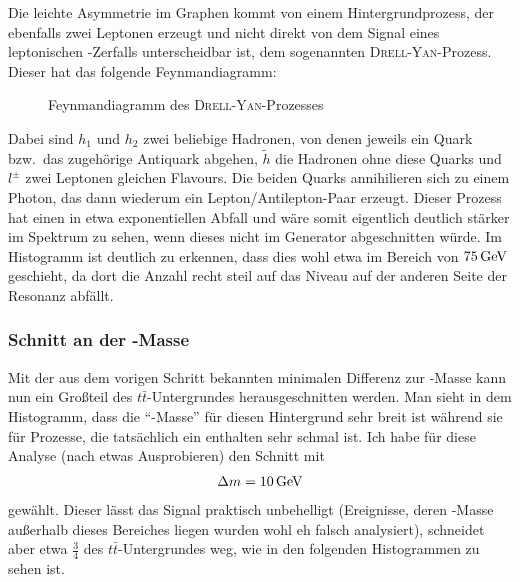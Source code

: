 Die leichte Asymmetrie im Graphen kommt von einem Hintergrundprozess, der
ebenfalls zwei Leptonen erzeugt und nicht direkt von dem Signal eines
leptonischen \Z-Zerfalls unterscheidbar ist, dem sogenannten
\textsc{Drell}-\textsc{Yan}-Prozess. Dieser hat das folgende Feynmandiagramm:
\begin{figure}[h!]
  \begin{center}
    
  \end{center}
  \caption{Feynmandiagramm des \textsc{Drell}-\textsc{Yan}-Prozesses}
  \label{fig:drellyan}
\end{figure}
Dabei sind $h_1$ und $h_2$ zwei beliebige Hadronen, von denen jeweils ein Quark
bzw.\ das zugehörige Antiquark abgehen, $\tilde{h}$ die Hadronen ohne diese
Quarks und $l^\pm$ zwei Leptonen gleichen Flavours. Die beiden Quarks
annihilieren sich zu einem Photon, das dann wiederum ein Lepton/Antilepton-Paar
erzeugt. Dieser Prozess hat einen in etwa exponentiellen Abfall und wäre somit
eigentlich deutlich stärker im Spektrum zu sehen, wenn dieses nicht im Generator
abgeschnitten würde. Im Histogramm ist deutlich zu erkennen, dass dies wohl etwa
im Bereich von $\unit[75]{GeV}$ geschieht, da dort die Anzahl recht steil auf
das Niveau auf der anderen Seite der Resonanz abfällt.

\subsubsection{Schnitt an der \Z-Masse}
Mit der aus dem vorigen Schritt bekannten minimalen Differenz zur \Z-Masse kann
nun ein Großteil des $t\bar{t}$-Untergrundes herausgeschnitten werden. Man sieht
in dem Histogramm, dass die "`\Z-Masse"' für diesen Hintergrund sehr breit ist
während sie für Prozesse, die tatsächlich ein \Z enthalten sehr schmal ist. Ich
habe für diese Analyse (nach etwas Ausprobieren) den Schnitt mit
\begin{align}
  \Delta m = \unit[10]{GeV}
\end{align}
gewählt. Dieser lässt das Signal praktisch unbehelligt (Ereignisse, deren
\Z-Masse außerhalb dieses Bereiches liegen wurden wohl eh falsch analysiert),
schneidet aber etwa $\frac{3}{4}$ des $t\bar{t}$-Untergrundes weg, wie in den
folgenden Histogrammen zu sehen ist.

\begin{figure}[htbp]
  \begin{center}
    
    
    
  \end{center}
  \caption{}
  \label{fig:<+label+>}
\end{figure}

